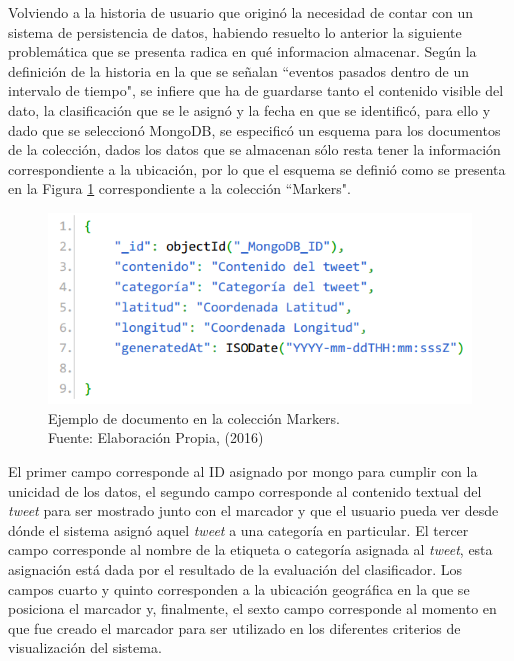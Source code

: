 Volviendo a la historia de usuario que originó la necesidad de contar con un sistema de persistencia de datos, habiendo resuelto lo anterior la siguiente problemática que se presenta radica en qué informacion almacenar. Según la definición de la historia en la que se señalan ``eventos pasados dentro de un intervalo de tiempo", se infiere que ha de guardarse tanto el contenido visible del dato, la clasificación que se le asignó y la fecha en que se identificó, para ello y dado que se seleccionó MongoDB, se especificó un esquema para los documentos de la colección, dados los datos que se almacenan sólo resta tener la información correspondiente a la ubicación, por lo que el esquema se definió como se presenta en la Figura \ref{fig:esquemaMarker1} correspondiente a la colección ``Markers".

\begin{figure}[H]
	\centering
	\captionsetup{justification=centering}
	\includegraphics[scale=0.8]{images/Marker1.png}
	\caption[Ejemplo de documento en la colección Markers.]{Ejemplo de documento en la colección Markers.\\Fuente: Elaboración Propia, (2016)}
	\label{fig:esquemaMarker1}
\end{figure}

El primer campo corresponde al ID asignado por mongo para cumplir con la unicidad de los datos, el segundo campo corresponde al contenido textual del \textit{tweet} para ser mostrado junto con el marcador y que el usuario pueda ver desde dónde el sistema asignó aquel \textit{tweet} a una categoría en particular. El tercer campo corresponde al nombre de la etiqueta o categoría asignada al \textit{tweet}, esta asignación está dada por el resultado de la evaluación del clasificador. Los campos cuarto y quinto corresponden a la ubicación geográfica en la que se posiciona el marcador y, finalmente, el sexto campo corresponde al momento en que fue creado el marcador para ser utilizado en los diferentes criterios de visualización del sistema.

